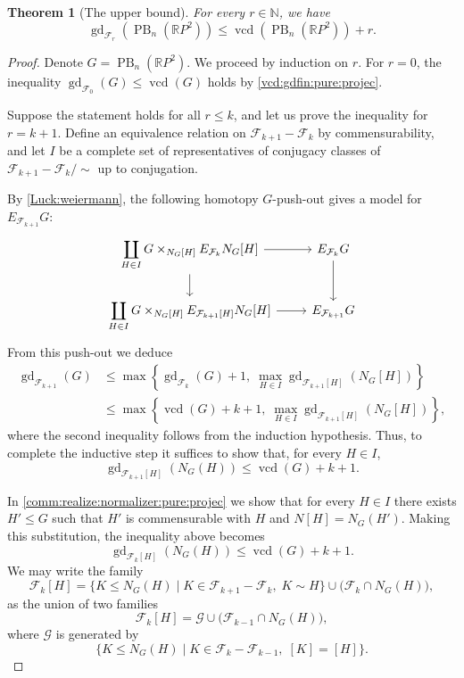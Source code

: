 \documentclass[a4paper,12pt,leqno]{amsart}
\newtheorem{theorem}{Theorem}[section]
\theoremstyle{definition}
\DeclareMathOperator{\vcd}{vcd}
\DeclareMathOperator{\gd}{gd}
\DeclareMathOperator{\pb}{PB}
\begin{document}
\begin{theorem}[The upper bound]\label{upper:bound:proyective}
For every $r \in \mathbb{N}$, we have
\[
  \gd_{\mathcal{F}_r}(\pb_n(\mathbb{R}P^2)) \leq \vcd(\pb_n(\mathbb{R}P^2)) + r.
\]
\end{theorem}

\begin{proof}
Denote $G = \pb_n(\mathbb{R}P^2)$. We proceed by induction on $r$. For $r = 0$, the inequality $\gd_{\mathcal{F}_0}(G) \leq \vcd(G)$ holds by \cref{vcd:gdfin:pure:projec}.

Suppose the statement holds for all $r \leq k$, and let us prove the inequality for $r = k+1$.
Define an equivalence relation on $\mathcal{F}_{k+1}- \mathcal{F}_k$ by commensurability,
and let $I$ be a complete set of representatives of conjugacy classes of
$\mathcal{F}_{k+1}- \mathcal{F}_k / {\sim}$ up to conjugation.

By \cref{Luck:weiermann}, the following homotopy $G$-push-out gives a model for $E_{\mathcal{F}_{k+1}}G$:
\[
\begin{tikzcd}
  \displaystyle\coprod_{H \in I} G \times_{N_G[H]} E_{\mathcal{F}_k}N_G[H]
    \arrow[r] \arrow[d] &
  E_{\mathcal{F}_k}G \arrow[d] \\
  \displaystyle\coprod_{H \in I} G \times_{N_G[H]} E_{\mathcal{F}_{k+1}[H]}N_G[H]
    \arrow[r] &
  E_{\mathcal{F}_{k+1}}G
\end{tikzcd}
\]
From this push-out we deduce
\begin{align*}
  \gd_{\mathcal{F}_{k+1}}(G)
    &\leq \max\!\left\{
        \gd_{\mathcal{F}_k}(G) + 1,\;
        \max_{H \in I} \gd_{\mathcal{F}_{k+1}[H]}\!\left(N_G[H]\right)
      \right\} \\
    &\leq \max\!\left\{
        \vcd(G) + k + 1,\;
        \max_{H \in I} \gd_{\mathcal{F}_{k+1}[H]}\!\left(N_G[H]\right)
      \right\},
\end{align*}
where the second inequality follows from the induction hypothesis.
Thus, to complete the inductive step it suffices to show that, for every $H \in I$,
\[
  \gd_{\mathcal{F}_{k+1}[H]}(N_G(H)) \leq \vcd(G) + k + 1.
\]

In \cref{comm:realize:normalizer:pure:projec} we show that for every $H \in I$ there exists $H' \leq G$ such that
$H'$ is commensurable with $H$ and $N[H]=N_G(H')$.
Making this substitution, the inequality above becomes
\[
  \gd_{\mathcal{F}_k[H]}(N_G(H)) \leq \vcd(G) + k + 1.
\]
We may write the family 
\[
  \mathcal{F}_k[H]
    = \bigl\{ K \leq N_G(H) \mid K \in \mathcal{F}_{k+1}- \mathcal{F}_k,\; K \sim H \bigr\}
      \cup \bigl(\mathcal{F}_k \cap N_G(H)\bigr),
\]
 as the union of two families
\[
  \mathcal{F}_k[H] = \mathcal{G} \cup \bigl(\mathcal{F}_{k-1} \cap N_G(H)\bigr),
\]
where $\mathcal{G}$ is generated by
\[
  \bigl\{ K \leq N_G(H) \mid K \in \mathcal{F}_k- \mathcal{F}_{k-1},\;
  [K] = [H] \bigr\}.
\]


\end{proof}
\end{document}
